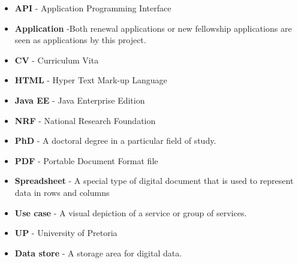 \documentclass[12pt]{article}
\begin{document}
\begin{itemize}

\item \textbf{API} - Application Programming Interface
\item \textbf{Application} -Both renewal applications or new fellowship applications are seen as applications by this project.
\item \textbf{CV} - Curriculum Vita
\item \textbf{HTML} - Hyper Text Mark-up Language
\item \textbf{Java EE} - Java Enterprise Edition
\item \textbf{NRF} - National Research Foundation
\item \textbf{PhD} - A doctoral degree in a particular field of study.
\item \textbf{PDF} - Portable Document Format file
\item \textbf{Spreadsheet} - A special type of digital document that is used to represent data in rows and columns
\item \textbf{Use case} - A visual depiction of a service or group of services.
\item \textbf{UP} - University of Pretoria
\item \textbf{Data store} - A storage area for digital data.
 


\end{itemize}	
\end{document}
